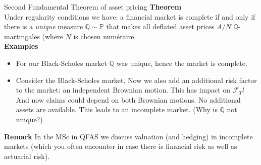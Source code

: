 \documentclass[pdf, handout]{beamer}
\begin{document}
\begin{frame}{Second Fundamental Theorem of asset pricing}
\textbf{Theorem} \\
Under regularity conditions we have:
a financial market 
is complete if and only if there is a \emph{unique}
measure $\mathbb{Q}\sim\mathbb{P}$ that makes 
all deflated asset prices $A/N$ $\mathbb{Q}$-martingales (where
$N$ is chosen num\'{e}raire.
\\
\vspace{.5cm}
\textbf{Examples}
\begin{itemize}
\item 
For our Black-Scholes market $\mathbb{Q}$ was unique, hence the
market is complete.
\item Consider the Black-Scholes market. Now we also add an additional risk factor to the market: an independent Brownian 
motion. This has impact on $\mathcal{F}_T$! And now claims could depend on both Brownian motions. No additional assets are available.  This leads to an incomplete market. (Why is
$\mathbb{Q}$ not unique?)
\end{itemize}
\textbf{Remark} In the MSc in QFAS we discuss
valuation (and hedging) in incomplete markets
(which you often encounter in case there is financial risk
as well as actuarial risk). 
\end{frame}
\end{document}
